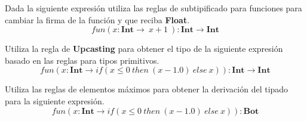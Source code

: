    \bigskip

    \begin{exercise}
        Dada la siguiente expresión utiliza las reglas de subtipificado para funciones para cambiar la firma de la función y que reciba \textbf{Float}.
        $$ fun(x:\textbf{Int} \rightarrow \ x + 1\ ) : \textbf{Int}  \rightarrow \textbf{Int} $$
    \end{exercise}

    \bigskip

    \begin{exercise}
        Utiliza la regla de \textbf{Upcasting} para obtener el tipo de la siguiente expresión basado en las reglas para tipos primitivos.
        $$ fun(x:\textbf{Int} \rightarrow if( x \leq 0\ then\ (x - 1.0) \ else\ x  ) ) : \textbf{Int}  \rightarrow \textbf{Int} $$
    \end{exercise}

    \bigskip

    \begin{exercise}
        Utiliza las reglas de elementos máximos para obtener la derivación del tipado para la siguiente expresión.
        $$ fun(x:\textbf{Int} \rightarrow if( x \leq 0\ then\ (x - 1.0) \ else\ x  ) ) : \textbf{Bot} $$
    \end{exercise}
 